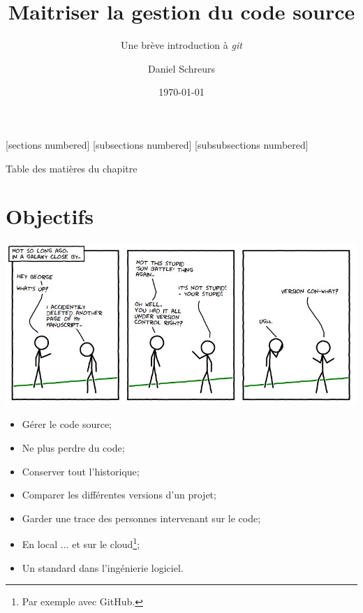 \documentclass[10pt]{beamer}
\title{Maitriser la gestion du code source}
\subtitle{Une brève introduction à \emph{git}}
\date{\today}
\author{Daniel Schreurs}
\institute{Haute École de Province de Liège}
\begin{document}
\maketitle

[sections numbered]
[subsections numbered]
[subsubsections numbered]
\begin{frame}[allowframebreaks]{Table des matières du chapitre}
    \tableofcontents[subsectionstyle=show/show/hide,subsubsectionstyle=show/show/hide,]
\end{frame}

\section{Objectifs}

\begin{frame}{\secname}
    \centerline{\includegraphics[width=\textwidth]{img/bd1.jpeg}}
\end{frame}

\begin{frame}{\secname}
    \begin{itemize}
        \item Gérer le code source;
        \item Ne plus perdre du code;
        \item Conserver tout l’historique;
        \item Comparer les différentes versions d’un projet;
        \item Garder une trace des personnes intervenant sur le code;
        \item En local ... et sur le cloud\footnote{Par exemple avec GitHub.};
        \item Un standard dans l’ingénierie logiciel.
    \end{itemize}
\end{frame}
\end{document}

